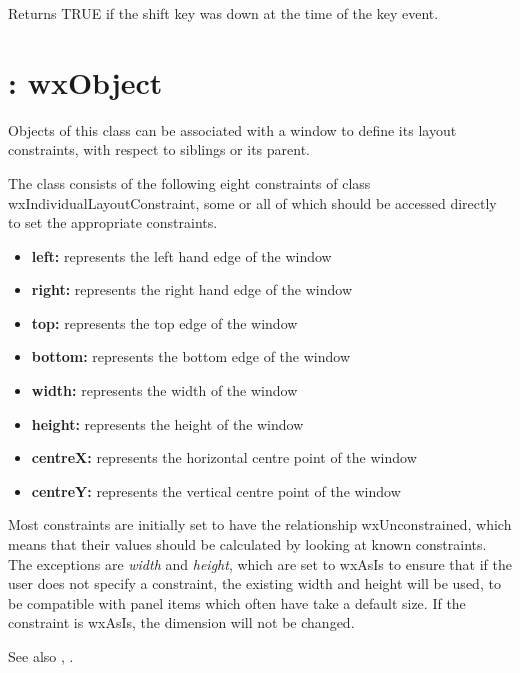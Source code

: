 Returns TRUE if the shift key was down at the time of the key event.

\section{: wxObject}\label{wxlayoutconstraints}


Objects of this class can be associated with a window to define its
layout constraints, with respect to siblings or its parent.

The class consists of the following eight constraints of class wxIndividualLayoutConstraint,
some or all of which should be accessed directly to set the appropriate
constraints.

\begin{itemize}\itemsep=0pt
\item {\bf left:} represents the left hand edge of the window
\item {\bf right:} represents the right hand edge of the window
\item {\bf top:} represents the top edge of the window
\item {\bf bottom:} represents the bottom edge of the window
\item {\bf width:} represents the width of the window
\item {\bf height:} represents the height of the window
\item {\bf centreX:} represents the horizontal centre point of the window
\item {\bf centreY:} represents the vertical centre point of the window
\end{itemize}

Most constraints are initially set to have the relationship wxUnconstrained,
which means that their values should be calculated by looking at known constraints.
The exceptions are {\it width} and {\it height}, which are set to wxAsIs to
ensure that if the user does not specify a constraint, the existing
width and height will be used, to be compatible with panel items which often
have take a default size. If the constraint is wxAsIs, the dimension will
not be changed.

See also , .


